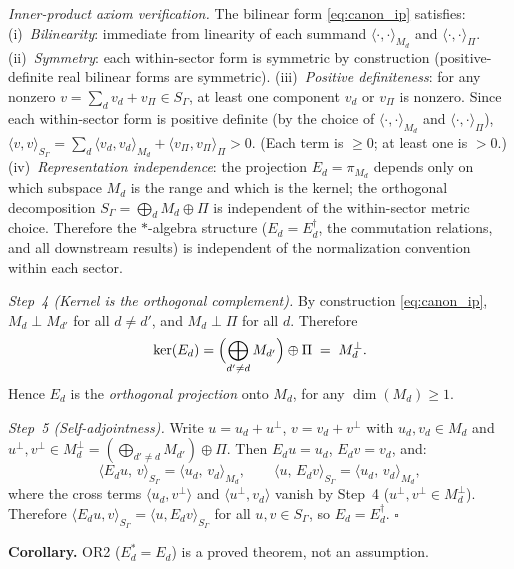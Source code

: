 \documentclass[11pt]{article}
\theoremstyle{remark}
\begin{document}
\begin{tcolorbox}[apfbox, title={Theorem $T_{\mathrm{adj}}$ --- Bridge Step 1: $*$-Involution from Cost Symmetry}]
\emph{Inner-product axiom verification.}  The bilinear form \eqref{eq:canon_ip} satisfies:
(i)~\emph{Bilinearity}: immediate from linearity of each summand $\langle \cdot, \cdot \rangle_{M_d}$ and $\langle \cdot, \cdot \rangle_\Pi$.
(ii)~\emph{Symmetry}: each within-sector form is symmetric by construction (positive-definite real bilinear forms are symmetric).
(iii)~\emph{Positive definiteness}: for any nonzero $v = \sum_d v_d + v_\Pi \in S_\Gamma$, at least one component $v_d$ or $v_\Pi$ is nonzero.  Since each within-sector form is positive definite (by the choice of $\langle \cdot, \cdot \rangle_{M_d}$ and $\langle \cdot, \cdot \rangle_\Pi$), $\langle v, v \rangle_{S_\Gamma} = \sum_d \langle v_d, v_d \rangle_{M_d} + \langle v_\Pi, v_\Pi \rangle_\Pi > 0$.  (Each term is $\ge 0$; at least one is $> 0$.)
(iv)~\emph{Representation independence}: the projection $E_d = \pi_{M_d}$ depends only on which subspace $M_d$ is the range and which is the kernel; the orthogonal decomposition $S_\Gamma = \bigoplus_d M_d \oplus \Pi$ is independent of the within-sector metric choice.  Therefore the $*$-algebra structure ($E_d = E_d^\dagger$, the commutation relations, and all downstream results) is independent of the normalization convention within each sector.

\textit{Step~4 (Kernel is the orthogonal complement).}  By construction \eqref{eq:canon_ip}, $M_d \perp M_{d'}$ for all $d \ne d'$, and $M_d \perp \Pi$ for all $d$.  Therefore
\[
\ker(E_d) = \Bigl(\bigoplus_{d' \ne d} M_{d'}\Bigr) \oplus \Pi \;=\; M_d^\perp.
\]
Hence $E_d$ is the \emph{orthogonal projection} onto $M_d$, for any $\dim(M_d) \ge 1$.

\textit{Step~5 (Self-adjointness).}  Write $u = u_d + u^\perp$, $v = v_d + v^\perp$ with $u_d, v_d \in M_d$ and $u^\perp, v^\perp \in M_d^\perp = (\bigoplus_{d' \ne d} M_{d'}) \oplus \Pi$.  Then $E_d u = u_d$, $E_d v = v_d$, and:
\[
\langle E_d u,\, v \rangle_{S_\Gamma} = \langle u_d,\, v_d \rangle_{M_d}, \qquad
\langle u,\, E_d v \rangle_{S_\Gamma} = \langle u_d,\, v_d \rangle_{M_d},
\]
where the cross terms $\langle u_d, v^\perp\rangle$ and $\langle u^\perp, v_d\rangle$ vanish by Step~4 ($u^\perp, v^\perp \in M_d^\perp$).  Therefore $\langle E_d u, v \rangle_{S_\Gamma} = \langle u, E_d v \rangle_{S_\Gamma}$ for all $u, v \in S_\Gamma$, so $E_d = E_d^\dagger$.  \hfill$\square$

\smallskip\noindent\textbf{Corollary.}  OR2 ($E_d^* = E_d$) is a proved theorem, not an assumption.


\end{tcolorbox}
\end{document}

